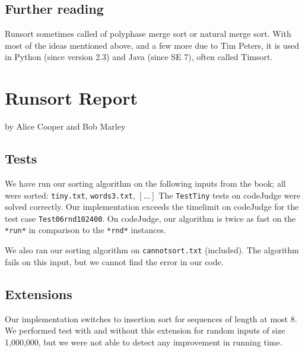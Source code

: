 \documentclass{tufte-handout}
\begin{document}
\subsection{Further reading}
Runsort sometimes called of polyphase merge sort or natural merge sort.
With most of the ideas mentioned above, and a few more due to Tim Peters, it is used in Python (since version 2.3) and Java (since SE 7), often called Timsort.

\newpage
\section{Runsort Report}


by Alice Cooper and Bob Marley

  \subsection{Tests}
  We have run our sorting algorithm on the following inputs from the book; all were sorted:
  {\tt tiny.txt}, {\tt words3.txt},  $[\ldots]$
  The \texttt{TestTiny} tests on codeJudge were solved correctly.
  Our implementation exceeds the timelimit on codeJudge for the test case \texttt{Test06rnd102400}.
  On codeJudge, our algorithm is twice as fast on the \texttt{*run*} in comparison to the \texttt{*rnd*} instances.

  We also ran our sorting algorithm on {\tt cannotsort.txt} (included).
  The algorithm fails on this input, but we cannot find the error in our code.

  \subsection{Extensions}  

  Our implementation switches to insertion sort for sequences of length at most 8.
  We performed test with and without this extension for random inputs of size 1,000,000, but
  we were not able to detect any improvement in running time.
\end{document}
